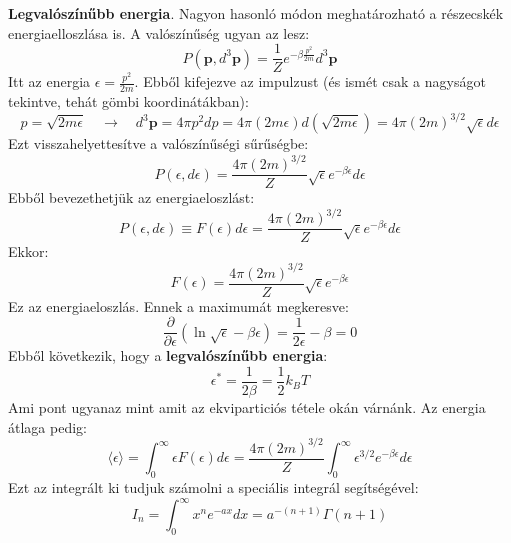 \documentclass[../main.tex]{subfiles}
\begin{document}
\textbf{Legvalószínűbb energia}. Nagyon hasonló módon meghatározható a részecskék energiaelloszlása is. A valószínűség ugyan az lesz:
\begin{equation}
    P(\mathbf{p}, d^3 \mathbf{p}) = \frac{1}{Z} e^{-\beta \frac{p^2}{2m}} d^3 \mathbf{p}
\end{equation}
Itt az energia $\epsilon = \frac{p^2}{2m}$. Ebből kifejezve az impulzust (és ismét csak a nagyságot tekintve, tehát gömbi koordinátákban):
\begin{equation}
    p = \sqrt{2 m \epsilon} \quad \rightarrow \quad d^3 \mathbf{p} = 4 \pi p^2 dp = 4 \pi (2 m \epsilon) d\left(\sqrt{2 m \epsilon}\right) = 4 \pi (2 m)^{3/2} \sqrt{\epsilon} d\epsilon
\end{equation}
Ezt visszahelyettesítve a valószínűségi sűrűségbe:
\begin{equation}
    P(\epsilon, d\epsilon) = \frac{4 \pi (2 m)^{3/2}}{Z} \sqrt{\epsilon} e^{-\beta \epsilon} d\epsilon
\end{equation}
Ebből bevezethetjük az energiaeloszlást:
\begin{equation}
    P(\epsilon, d\epsilon) \equiv F(\epsilon) d\epsilon = \frac{4 \pi (2 m)^{3/2}}{Z} \sqrt{\epsilon} e^{-\beta \epsilon} d\epsilon
\end{equation}
Ekkor:
\begin{equation}
    \boxed{F(\epsilon) = \frac{4 \pi (2 m)^{3/2}}{Z} \sqrt{\epsilon} e^{-\beta \epsilon}}
\end{equation}
Ez az energiaeloszlás. Ennek a maximumát megkeresve:
\begin{equation}
    \frac{\partial}{\partial \epsilon} \left( \ln \sqrt{\epsilon} - \beta \epsilon \right) = \frac{1}{2 \epsilon} - \beta = 0
\end{equation}
Ebből következik, hogy a \textbf{legvalószínűbb energia}:
\begin{equation}
    \epsilon^{*} = \frac{1}{2 \beta} = \frac{1}{2} k_B T
\end{equation}
Ami pont ugyanaz mint amit az ekviparticiós tétele okán várnánk.
Az energia átlaga pedig:
\begin{equation}
    \langle \epsilon \rangle = \int_0^{\infty} \epsilon F(\epsilon) d\epsilon = \frac{4 \pi (2 m)^{3/2}}{Z} \int_0^{\infty} \epsilon^{3/2} e^{-\beta \epsilon} d\epsilon
\end{equation}
Ezt az integrált ki tudjuk számolni a speciális integrál segítségével:
\begin{equation}
    I_n = \int_0^{\infty} x^n e^{-a x} dx = a^{-(n+1)} \Gamma(n+1)
\end{equation}
\end{document}
